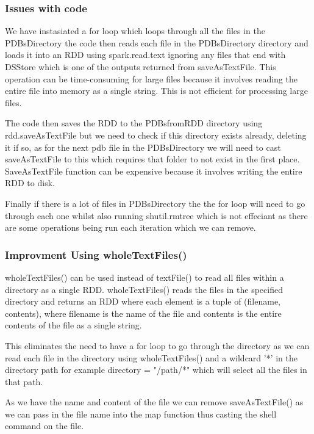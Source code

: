 \documentclass[]{final_report}
\begin{document}
\clearpage

\subsubsection{Issues with code}
We have instasiated a for loop which loops through all the files in the PDBsDirectory the code then reads each file in the PDBsDirectory directory and loads it into an RDD using spark.read.text ignoring any files that end with DSStore which is one of the outputs returned from saveAsTextFile. This operation can be time-consuming for large files because it involves reading the entire file into memory as a single string. This is not efficient for processing large files.

The code then saves the RDD to the PDBsfromRDD directory using rdd.saveAsTextFile but we need to check if this directory exists already, deleting it if so, as for the next pdb file in the PDBsDirectory we will need to cast saveAsTextFile to this which requires that folder to not exist in the first place. SaveAsTextFile function can be expensive because it involves writing the entire RDD to disk.

Finally if there is a lot of files in PDBsDirectory the the for loop will need to go through each one whilst also running shutil.rmtree which is not effeciant as there are some operations being run each iteration which we can remove.

\clearpage

\subsubsection{Improvment Using wholeTextFiles()}

wholeTextFiles() can be used instead of textFile() to read all files within a directory as a single RDD. wholeTextFiles() reads the files in the specified directory and returns an RDD where each element is a tuple of (filename, contents), where filename is the name of the file and contents is the entire contents of the file as a single string.

This eliminates the need to have a for loop to go through the directory as we can read each file in the directory using wholeTextFiles() and a wildcard '*' in the directory path for example directory = "/path/*" which will select all the files in that path.

As we have the name and content of the file we can remove saveAsTextFile() as we can pass in the file name into the map function thus casting the shell command on the file.
\end{document}
